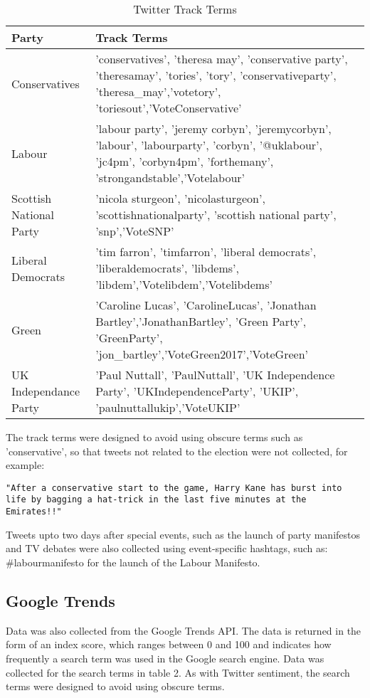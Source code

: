 \documentclass{article}
\begin{document}
\begin{table}[h]
\caption{Twitter Track Terms}
\begin{tabular}{|p{2.5cm}|p{9cm}|} \hline
\textbf{Party} & \textbf{Track Terms} \\ \hline
Conservatives & 'conservatives', 'theresa may', 'conservative party', 'theresamay', 'tories', 'tory', 'conservativeparty', 'theresa\_may','votetory', 'toriesout','VoteConservative'\\ \hline
Labour & 'labour party', 'jeremy corbyn', 'jeremycorbyn', 'labour', 'labourparty', 'corbyn', '@uklabour', 'jc4pm', 'corbyn4pm', 'forthemany', 'strongandstable','Votelabour'\\ \hline
Scottish National Party & 'nicola sturgeon', 'nicolasturgeon', 'scottishnationalparty', 'scottish national party', 'snp','VoteSNP'\\ \hline
Liberal Democrats &  'tim farron', 'timfarron', 'liberal democrats', 'liberaldemocrats', 'libdems', 'libdem','Votelibdem','Votelibdems'\\ \hline
Green & 'Caroline Lucas', 'CarolineLucas', 'Jonathan Bartley','JonathanBartley', 'Green Party', 'GreenParty', 'jon\_bartley','VoteGreen2017','VoteGreen'\\ \hline
UK Independance Party & 'Paul Nuttall', 'PaulNuttall', 'UK Independence Party', 'UKIndependenceParty', 'UKIP', 'paulnuttallukip','VoteUKIP'\\ \hline
\end{tabular}
\end{table}

The track terms were designed to avoid using obscure terms such as 'conservative', so that tweets not related to the election were not collected, for example:

\begin{verbatim}
"After a conservative start to the game, Harry Kane has burst into
life by bagging a hat-trick in the last five minutes at the Emirates!!"
\end{verbatim}

Tweets upto two days after special events, such as the launch of party manifestos and TV debates were also collected using event-specific hashtags, such as: \#labourmanifesto for the launch of the Labour Manifesto.

\subsection{Google Trends}
Data was also collected from the Google Trends API. The data is returned in the form of an index score, which ranges between 0 and 100 and indicates how frequently a search term was used in the Google search engine. Data was collected for the search terms in table 2. As with Twitter sentiment, the search terms were designed to avoid using obscure terms.\\
\end{document}
